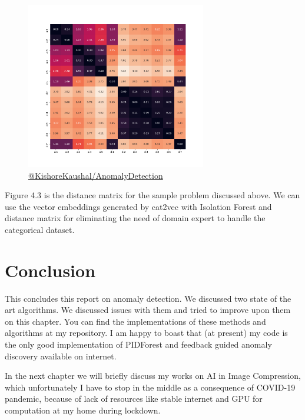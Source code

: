 \begin{figure}[!ht]
    \label{fig:distance-matrix}
    \centering
    \includegraphics[width=0.7\textwidth]{../fig/chapter4/InterFeatureDistance.png}
    {\href{https://github.com/KishoreKaushal/AnomalyDetection/blob/master/isolationforest/cat2vec.py}{@KishoreKaushal/AnomalyDetection}}
\end{figure}



Figure 4.3 is the distance matrix for the sample problem discussed above. We can use the vector embeddings generated by cat2vec with Isolation Forest and distance matrix for eliminating the need of domain expert to handle the categorical dataset. 

\section{Conclusion}

This concludes this report on anomaly detection. We discussed two state of the art algorithms. We discussed issues with them and tried to improve upon them on this chapter.
You can find the implementations of these methods and algorithms at my repository. I am happy to boast that (at present) my code is the only good implementation of PIDForest and feedback guided anomaly discovery available on internet.

In the next chapter we will briefly discuss my works on AI in Image Compression, which unfortunately I have to stop in the middle as a consequence of COVID-19 pandemic, because of lack of resources like stable internet and GPU for computation at my home during lockdown.